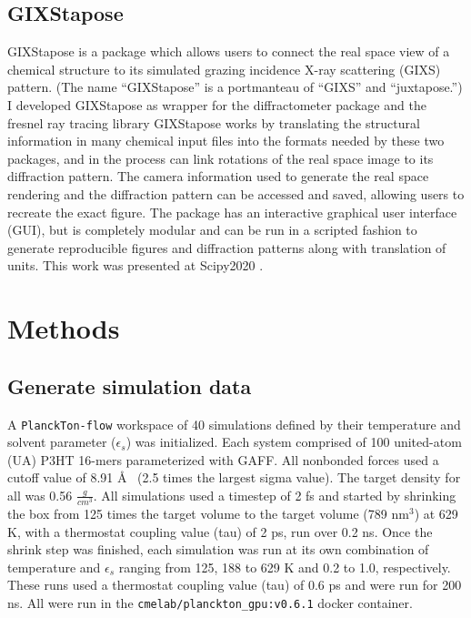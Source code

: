 \subsection{GIXStapose}
GIXStapose is a package which allows users to connect the real space view of a chemical structure to its simulated grazing incidence X-ray scattering (GIXS) pattern. (The name ``GIXStapose'' is a portmanteau of ``GIXS'' and ``juxtapose.'') 
I developed GIXStapose as wrapper for the diffractometer package and the fresnel ray tracing library \cite{Diffract, Jones2017, fresnel}
GIXStapose works by translating the structural information in many chemical input files into the formats needed by these two packages, and in the process can link rotations of the real space image to its diffraction pattern. 
The camera information used to generate the real space rendering and the diffraction pattern can be accessed and saved, allowing users to recreate the exact figure.
The package has an interactive graphical user interface (GUI), but is completely modular and can be run in a scripted fashion to generate reproducible figures and diffraction patterns along with translation of units. 
This work was presented at Scipy2020 \cite{scipy2020}. 

\section{Methods}
\subsection{Generate simulation data}
A \texttt{PlanckTon-flow} workspace of 40 simulations defined by their temperature and solvent parameter ($\epsilon_{s}$) was initialized. Each system comprised of 100 united-atom (UA) P3HT 16-mers parameterized with GAFF. %
All nonbonded forces used a cutoff value of 8.91 \AA~ (2.5 times the largest sigma value). The target density for all was 0.56 $\frac{g}{cm^{3}}$. All simulations used a timestep of 2 fs and started by shrinking the box from 125 times the target volume to the target volume (789 nm$^3$) at 629 K, with a thermostat coupling value (tau) of 2 ps, run over 0.2 ns. Once the shrink step was finished, each simulation was run at its own combination of temperature and $\epsilon_{s}$ ranging from 125, 188 to 629 K and 0.2 to 1.0, respectively. These runs used a thermostat coupling value (tau) of 0.6 ps and were run for 200 ns. All were run in the \lstinline{cmelab/planckton_gpu:v0.6.1} docker container.


